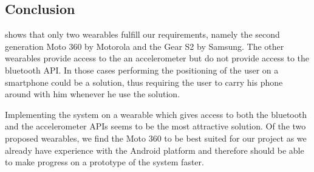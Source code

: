 
\subsection{Conclusion}

 shows that only two wearables fulfill our requirements, namely the second generation Moto 360 by Motorola and the Gear S2 by Samsung. The other wearables provide access to the an accelerometer but do not provide access to the bluetooth API. In those cases performing the positioning of the user on a smartphone could be a solution, thus requiring the user to carry his phone around with him whenever he use the solution.

Implementing the system on a wearable which gives access to both the bluetooth and the accelerometer APIs seems to be the most attractive solution. Of the two proposed wearables, we find the Moto 360 to be best suited for our project as we already have experience with the Android platform and therefore should be able to make progress on a prototype of the system faster.

